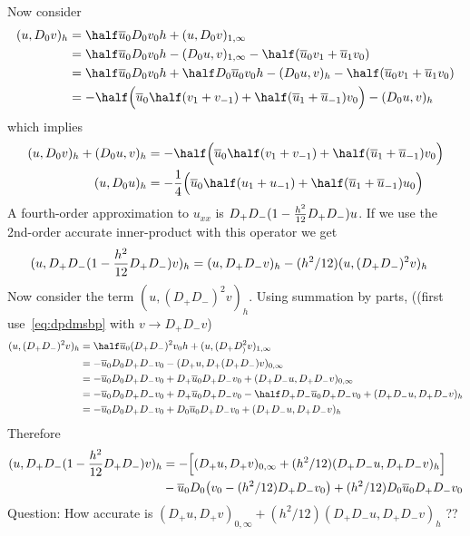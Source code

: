 Now consider
\begin{align}
  (u, D_0 v )_h  &=   \half \ubar_0 D_0 v_0 h + (u,D_0v)_{1,\infty} \\
      &= \half \ubar_0 D_0 v_0 h  - (D_0 u,v)_{1,\infty} - \half( \ubar_0 v_1 + \ubar_1 v_0) \\
      &= \half \ubar_0 D_0 v_0 h + \half D_0 \ubar_0 v_0 h  - (D_0 u,v)_h  - \half( \ubar_0 v_1 + \ubar_1 v_0)   \\   
      &= - \half \Big( \ubar_0 \half(v_1+v_{-1}) + \half(\ubar_1+\ubar_{-1}) v_0 \Big)  - (D_0 u,v)_h  \label{eq:uD0v}
\end{align}
which implies
\begin{align}
  (u, D_0 v )_h + (D_0 u,  v )_h  &= -\half\Big( \ubar_0 \half(v_1+v_{-1}) + \half(\ubar_1+\ubar_{-1}) v_0 \Big) \\
  (u, D_0 u )_h        &= -\frac{1}{4}\Big( \ubar_0 \half(u_1+u_{-1}) + \half(\ubar_1+\ubar_{-1}) u_0 \Big)   
\end{align}
% 
% 
A fourth-order approximation to $u_{xx}$ is $D_+D_-(1-{h^2\over 12}D_+D_-)u$.
If we use the 2nd-order accurate inner-product with this operator we get 
\begin{align}
  (u, D_+D_-(1-{h^2\over 12}D_+D_-) v )_h  &= (u, D_+D_- v)_h - (h^2/12) (u,(D_+D_-)^2 v)_h
\end{align}
Now consider the term $(u,(D_+D_-)^2 v)_h$. 
Using summation by parts, ((first use~\eqref{eq:dpdmsbp} with $v \rightarrow D_+D_-v$)
\begin{align}
  (u,(D_+D_-)^2 v)_h &= \half \ubar_0 (D_+D_-)^2 v_0 h + (u,(D_+D_)^2 v)_{1,\infty} \\
       &= -\ubar_0 D_0 D_+D_- v_0 -(D_+u, D_+(D_+D_-)v)_{0,\infty} \\
       &= -\ubar_0 D_0 D_+D_- v_0 + D_+\ubar_0 D_+D_- v_0 + (D_+D_- u, D_+D_- v)_{0,\infty} \\
       &= -\ubar_0 D_0 D_+D_- v_0 + D_+\ubar_0 D_+D_- v_0 -\half D_+D_- \ubar_0  D_+D_- v_0 + (D_+D_- u, D_+D_- v)_h \\
       &= -\ubar_0 D_0 D_+D_- v_0 + D_0\ubar_0 D_+D_- v_0  + (D_+D_- u, D_+D_- v)_h
\end{align}
Therefore  
\begin{align}
   (u, D_+D_-(1-{h^2\over 12}D_+D_-) v )_h  &= 
       - \Big[ (D_+ u, D_+ v)_{0,\infty} + (h^2/12)(D_+D_-u,D_+D_-v)_h \Big] \\
          & -  \overline{u}_0 D_0 \big( v_0 - (h^2/12)D_+D_-v_0\big) + (h^2/12)D_0\overline{u}_0 D_+D_-v_0 \label{eq:dpdmsq}
\end{align}
Question: How accurate is $(D_+ u, D_+ v)_{0,\infty} + (h^2/12)(D_+D_-u,D_+D_-v)_h$ ??

